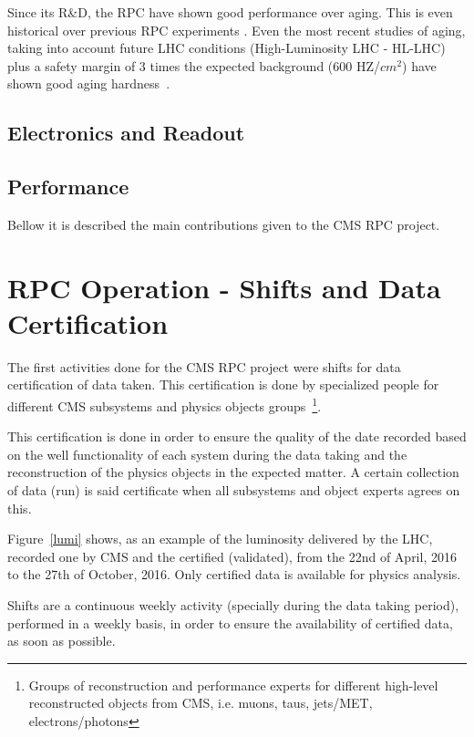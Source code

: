 Since its R\&D, the RPC have shown good performance over aging. This is even historical over previous RPC experiments . Even the most recent studies of aging, taking into account future LHC conditions (High-Luminosity LHC - HL-LHC) plus a safety margin of 3 times the expected background (600 HZ/$cm^2$) have shown good aging hardness~\cite{andrea_rpc_2018}.

\subsection{Electronics and Readout}



\subsection{Performance}


Bellow it is described the main contributions given to the CMS RPC project.

\section{RPC Operation - Shifts and Data Certification}

The first activities done for the CMS RPC project were shifts for data certification of data taken. This certification is done by specialized people for different CMS subsystems and physics objects groups~\footnote{Groups of reconstruction and performance experts for different high-level reconstructed objects from CMS, i.e. muons, taus, jets/MET, electrons/photons}. 

This certification is done in order to ensure the quality of the date recorded based on the well functionality of each system during the data taking and the reconstruction of the physics objects in the expected matter. A certain collection of data (run) is said certificate when all subsystems and object experts agrees on this.

Figure~\ref{lumi} shows, as an example of the luminosity delivered by the LHC, recorded one by CMS and the certified (validated), from the 22nd of April, 2016 to the 27th of October, 2016. Only certified data is available for physics analysis.

Shifts are a continuous weekly activity (specially during the data taking period), performed in a weekly basis, in order to ensure the availability of certified data, as soon as possible.

